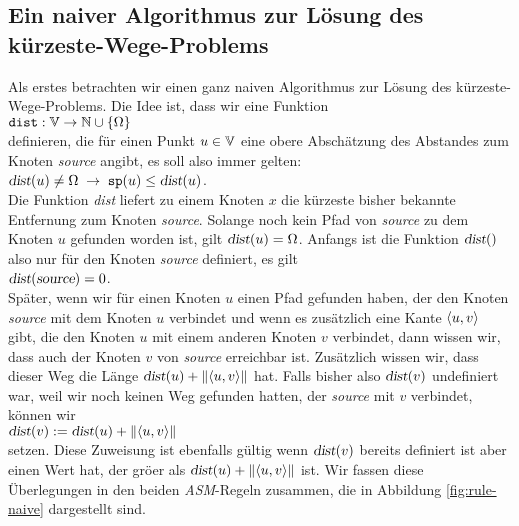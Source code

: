 \subsection{Ein naiver Algorithmus zur L\"osung des k\"urzeste-Wege-Problems}
Als erstes betrachten wir einen ganz naiven Algorithmus zur L\"osung des k\"urzeste-Wege-Problems.
Die Idee ist, dass wir eine Funktion \\[0.2cm]
\hspace*{1.3cm} $\texttt{dist}: {\mathbb V} \rightarrow {\mathbb N} \cup \{\Omega\}$ \\[0.2cm]
definieren, die f\"ur einen Punkt $u \in {\mathbb V}$ eine obere Absch\"atzung des Abstandes zum Knoten
\textsl{source} angibt, es soll also immer gelten: \\[0.2cm]
\hspace*{1.3cm} $\textsl{dist}(u) \not= \Omega \;\rightarrow\; \mbox{\tt sp}(u) \leq
\textsl{dist}(u)$. \\[0.2cm]
Die Funktion \textsl{dist} liefert zu einem Knoten $x$ die k\"urzeste bisher
bekannte Entfernung zum Knoten \textsl{source}.  Solange noch kein Pfad von
\textsl{source} zu dem Knoten $u$ gefunden worden ist, gilt $\textsl{dist}(u) = \Omega$.
Anfangs ist die Funktion $\textsl{dist}()$ also nur f\"ur den Knoten \textsl{source}
definiert, es gilt \\[0.2cm]
\hspace*{1.3cm} $\textsl{dist}(\textsl{source}) = 0$. \\[0.2cm]
Sp\"ater, wenn wir f\"ur einen Knoten $u$ einen Pfad gefunden haben, der den Knoten
\textsl{source} mit dem Knoten $u$ verbindet und wenn es zus\"atzlich eine Kante
$\pair(u,v)$ gibt, die den Knoten $u$ mit einem anderen Knoten $v$ verbindet, dann wissen
wir, dass auch der Knoten $v$ von \textsl{source} erreichbar ist.  Zus\"atzlich wissen wir,
dass dieser Weg die L\"ange $\textsl{dist}(u) + \weight{\pair(u,v)}$ hat.  Falls bisher also
$\textsl{dist}(v)$ undefiniert war, weil wir noch keinen Weg gefunden hatten, der
\textsl{source} mit $v$ verbindet, k\"onnen wir \\
\hspace*{1.3cm} $\textsl{dist}(v) := \textsl{dist}(u) + \weight{\pair(u,v)}$ \\[0.2cm]
setzen.  Diese Zuweisung ist ebenfalls g\"ultig wenn $\textsl{dist}(v)$ bereits definiert
ist aber einen Wert hat, der gr\"o\3er als $\textsl{dist}(u) + \weight{\pair(u,v)}$ ist.
Wir fassen diese Überlegungen in den beiden
\textsl{ASM}-Regeln zusammen, die in Abbildung \ref{fig:rule-naive} dargestellt sind.  
